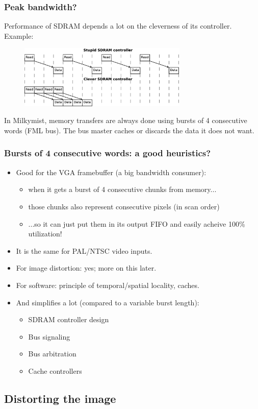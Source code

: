 \documentclass{beamer}
\begin{document}
\frame
{
  \frametitle{Peak bandwidth?}
  
  Performance of SDRAM depends a lot on the cleverness of its controller. Example:
  
  \begin{figure}[H]
  \includegraphics[height=30mm]{memlatency.eps}
  \end{figure}
  
  In Milkymist, memory transfers are always done using bursts of 4 consecutive words (FML bus). The bus master caches or discards the data it does not want.
}

\frame
{
  \frametitle{Bursts of 4 consecutive words: a good heuristics?}
  
  \begin{itemize}
  \item Good for the VGA framebuffer (a big bandwidth consumer):
  \begin{itemize}
  \item when it gets a burst of 4 consecutive chunks from memory...
  \item those chunks also represent consecutive pixels (in scan order)
  \item ...so it can just put them in its output FIFO and easily acheive 100\% utilization!
  \end{itemize}
  \item It is the same for PAL/NTSC video inputs.
  \item For image distortion: yes; more on this later.
  \item For software: principle of temporal/spatial locality, caches.
  \item And simplifies a lot (compared to a variable burst length):
  \begin{itemize}
  \item SDRAM controller design
  \item Bus signaling
  \item Bus arbitration
  \item Cache controllers
  \end{itemize}
  \end{itemize}
}

\subsection{Distorting the image}
\frame
{
  \begin{center}
  \end{center}
}
\end{document}
